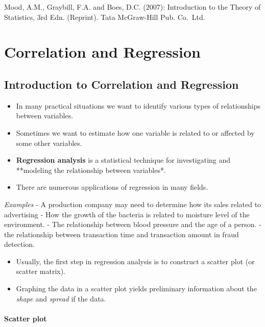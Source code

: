 \documentclass[]{book}
\providecommand{\tightlist}{%
  \setlength{\itemsep}{0pt}\setlength{\parskip}{0pt}}
\begin{document}
Mood, A.M., Graybill, F.A. and Boes, D.C. (2007): Introduction to the Theory of Statistics, 3rd Edn. (Reprint). Tata McGraw-Hill Pub. Co.~Ltd.

\hypertarget{correlation-and-regression}{%
\chapter{Correlation and Regression}\label{correlation-and-regression}}


\hypertarget{introduction-to-correlation-and-regression}{%
\section{Introduction to Correlation and Regression}\label{introduction-to-correlation-and-regression}}

\begin{itemize}
\tightlist
\item
  In many practical situations we want to identify various types of relationships between variables.
\item
  Sometimes we want to estimate how one variable is related to or affected by some other variables.
\item
  \textbf{Regression analysis} is a statistical technique for investigating and **modeling the relationship between variables*.
\item
  There are numerous applications of regression in many fields.
\end{itemize}

\emph{Examples}
- A production company may need to determine how its sales related to advertising
- How the growth of the bacteria is related to moisture level of the environment.
- The relationship between blood pressure and the age of a person.
- the relationship between transaction time and transaction amount in fraud detection.

\begin{itemize}
\tightlist
\item
  Usually, the first step in regression analysis is to construct a scatter plot (or scatter matrix).
\item
  Graphing the data in a scatter plot yields preliminary information about the \emph{shape} and \emph{spread} if the data.
\end{itemize}

\hypertarget{scatter-plot-1}{%
\subsubsection{Scatter plot}\label{scatter-plot-1}}
\end{document}
